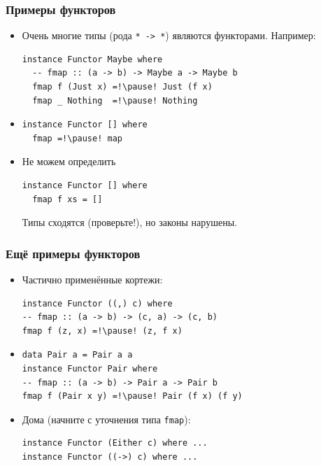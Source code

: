\documentclass[11pt]{beamer}
\begin{document}
\begin{frame}[fragile]
  \frametitle{Примеры функторов}
  \begin{itemize}
    \item Очень многие типы (рода \lstinline|* -> *|) являются функторами. Например:
          \begin{lstlisting}
instance Functor Maybe where 
  -- fmap :: (a -> b) -> Maybe a -> Maybe b
  fmap f (Just x) =!\pause! Just (f x)
  fmap _ Nothing  =!\pause! Nothing
\end{lstlisting}
          \pause
    \item
          \begin{lstlisting}
instance Functor [] where 
  fmap =!\pause! map
\end{lstlisting}
    \item Не можем определить
          \begin{lstlisting}
instance Functor [] where 
  fmap f xs = []
\end{lstlisting}
          \pause
          Типы сходятся (проверьте!), но законы нарушены.
  \end{itemize}
\end{frame}

\begin{frame}[fragile]
  \frametitle{Ещё примеры функторов}
  \begin{itemize}
    \item Частично применённые кортежи:
          \begin{lstlisting}
instance Functor ((,) c) where 
-- fmap :: (a -> b) -> (c, a) -> (c, b)
fmap f (z, x) =!\pause! (z, f x)
\end{lstlisting}
          \pause
    \item
          \begin{lstlisting}
data Pair a = Pair a a
instance Functor Pair where 
-- fmap :: (a -> b) -> Pair a -> Pair b
fmap f (Pair x y) =!\pause! Pair (f x) (f y)
\end{lstlisting}
          \pause
    \item Дома (начните с уточнения типа \lstinline|fmap|):
          \begin{lstlisting}
instance Functor (Either c) where ...
instance Functor ((->) c) where ...
\end{lstlisting}
  \end{itemize}
\end{frame}
\end{document}
